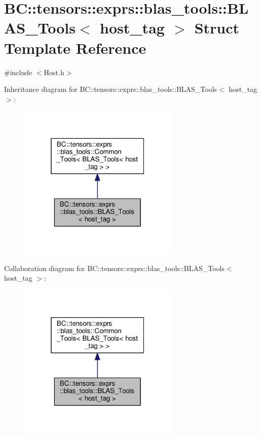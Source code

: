 \hypertarget{structBC_1_1tensors_1_1exprs_1_1blas__tools_1_1BLAS__Tools_3_01host__tag_01_4}{}\section{BC\+:\+:tensors\+:\+:exprs\+:\+:blas\+\_\+tools\+:\+:B\+L\+A\+S\+\_\+\+Tools$<$ host\+\_\+tag $>$ Struct Template Reference}
\label{structBC_1_1tensors_1_1exprs_1_1blas__tools_1_1BLAS__Tools_3_01host__tag_01_4}


{\ttfamily \#include $<$Host.\+h$>$}



Inheritance diagram for BC\+:\+:tensors\+:\+:exprs\+:\+:blas\+\_\+tools\+:\+:B\+L\+A\+S\+\_\+\+Tools$<$ host\+\_\+tag $>$\+:
\nopagebreak
\begin{figure}[H]
\begin{center}
\leavevmode
\includegraphics[width=217pt]{structBC_1_1tensors_1_1exprs_1_1blas__tools_1_1BLAS__Tools_3_01host__tag_01_4__inherit__graph}
\end{center}
\end{figure}


Collaboration diagram for BC\+:\+:tensors\+:\+:exprs\+:\+:blas\+\_\+tools\+:\+:B\+L\+A\+S\+\_\+\+Tools$<$ host\+\_\+tag $>$\+:
\nopagebreak
\begin{figure}[H]
\begin{center}
\leavevmode
\includegraphics[width=217pt]{structBC_1_1tensors_1_1exprs_1_1blas__tools_1_1BLAS__Tools_3_01host__tag_01_4__coll__graph}
\end{center}
\end{figure}

